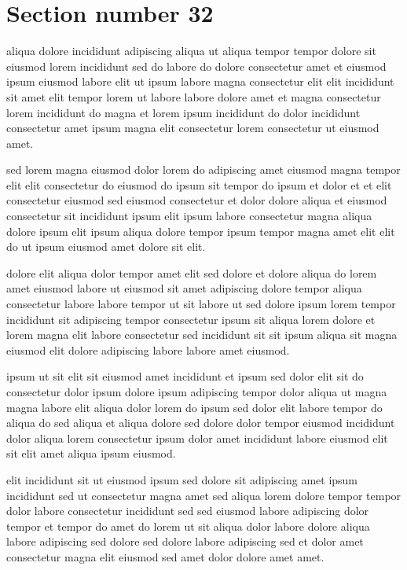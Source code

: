 \documentclass{article}
\begin{document}
\section{Section number 32}\label{sec:32}
aliqua dolore incididunt adipiscing aliqua ut aliqua tempor tempor dolore sit eiusmod lorem incididunt sed do labore do dolore consectetur amet et eiusmod ipsum eiusmod labore elit ut ipsum labore magna consectetur elit elit incididunt sit amet elit tempor lorem ut labore labore dolore amet et magna consectetur lorem incididunt do magna et lorem ipsum incididunt do dolor incididunt consectetur amet ipsum magna elit consectetur lorem consectetur ut eiusmod amet.

sed lorem magna eiusmod dolor lorem do adipiscing amet eiusmod magna tempor elit elit consectetur do eiusmod do ipsum sit tempor do ipsum et dolor et et elit consectetur eiusmod sed eiusmod consectetur et dolor dolore aliqua et eiusmod consectetur sit incididunt ipsum elit ipsum labore consectetur magna aliqua dolore ipsum elit ipsum aliqua dolore tempor ipsum tempor magna amet elit elit do ut ipsum eiusmod amet dolore sit elit.

dolore elit aliqua dolor tempor amet elit sed dolore et dolore aliqua do lorem amet eiusmod labore ut eiusmod sit amet adipiscing dolore tempor aliqua consectetur labore labore tempor ut sit labore ut sed dolore ipsum lorem tempor incididunt sit adipiscing tempor consectetur ipsum sit aliqua lorem dolore et lorem magna elit labore consectetur sed incididunt sit sit ipsum aliqua sit magna eiusmod elit dolore adipiscing labore labore amet eiusmod.

ipsum ut sit elit sit eiusmod amet incididunt et ipsum sed dolor elit sit do consectetur dolor ipsum dolore ipsum adipiscing tempor dolor aliqua ut magna magna labore elit aliqua dolor lorem do ipsum sed dolor elit labore tempor do aliqua do sed aliqua et aliqua dolore sed dolore dolor tempor eiusmod incididunt dolor aliqua lorem consectetur ipsum dolor amet incididunt labore eiusmod elit sit elit amet aliqua ipsum eiusmod.

elit incididunt sit ut eiusmod ipsum sed dolore sit adipiscing amet ipsum incididunt sed ut consectetur magna amet sed aliqua lorem dolore tempor tempor dolor labore consectetur incididunt sed sed eiusmod labore adipiscing dolor tempor et tempor do amet do lorem ut sit aliqua dolor labore dolore aliqua labore adipiscing sed dolore sed dolore labore adipiscing sed et dolor amet consectetur magna elit eiusmod sed amet dolor dolore amet amet.
\end{document}
